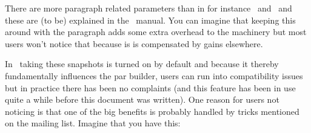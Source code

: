 \starttabulate
\NC \type {\hsize}                 \NC \NC \NR
\NC \type {\leftskip}              \NC \NC \NR
\NC \type {\rightskip}             \NC \NC \NR
\NC \type {\hangindent}            \NC \NC \NR
\NC \type {\hangafter}             \NC \NC \NR
\NC \type {\parindent}             \NC \NC \NR
\NC \type {\parfillleftskip}       \NC \NC \NR
\NC \type {\parfillrightskip}      \NC \NC \NR
\NC \type {\adjustspacing}         \NC \NC \NR
\NC \type {\protrudechars}         \NC \NC \NR
\NC \type {\pretolerance}          \NC \NC \NR
\NC \type {\tolerance}             \NC \NC \NR
\NC \type {\emergencystretch}      \NC \NC \NR
\NC \type {\looseness}             \NC \NC \NR
\NC \type {\lastlinefit}           \NC \NC \NR
\NC \type {\linepenalty}           \NC \NC \NR
\NC \type {\interlinepenalty}      \NC \NC \NR
\NC \type {\clubpenalty}           \NC \NC \NR
\NC \type {\widowpenalty}          \NC \NC \NR
\NC \type {\displaywidowpenalty}   \NC \NC \NR
\NC \type {\brokenpenalty}         \NC \NC \NR
\NC \type {\adjdemerits}           \NC \NC \NR
\NC \type {\doublehyphendemerits}  \NC \NC \NR
\NC \type {\finalhyphendemerits}   \NC \NC \NR
\NC \type {\parshape}              \NC \NC \NR
\NC \type {\interlinepenalties}    \NC \NC \NR
\NC \type {\clubpenalties}         \NC \NC \NR
\NC \type {\widowpenalties}        \NC \NC \NR
\NC \type {\displaywidowpenalties} \NC \NC \NR
\NC \type {\baselineskip}          \NC \NC \NR
\NC \type {\lineskip}              \NC \NC \NR
\NC \type {\lineskiplimit}         \NC \NC \NR
\NC \type {\adjustspacingstep}     \NC \NC \NR
\NC \type {\adjustspacingshrink}   \NC \NC \NR
\NC \type {\adjustspacingstretch}  \NC \NC \NR
\NC \type {\hyphenationmode}       \NC \NC \NR
\stoptabulate

There are more paragraph related parameters than in for instance \PDFTEX\ and
\LUATEX\ and these are (to be) explained in the \LUAMETATEX\ manual. You can
imagine that keeping this around with the paragraph adds some extra overhead to
the machinery but most users won't notice that because is is compensated by gains
elsewhere.

In \LMTX\ taking these snapshots is turned on by default and because it thereby
fundamentally influences the par builder, users can run into compatibility issues
but in practice there has been no complaints (and this feature has been in use
quite a while before this document was written). One reason for users not
noticing is that one of the big benefits is probably handled by tricks mentioned on the
mailing list. Imagine that you have this:


